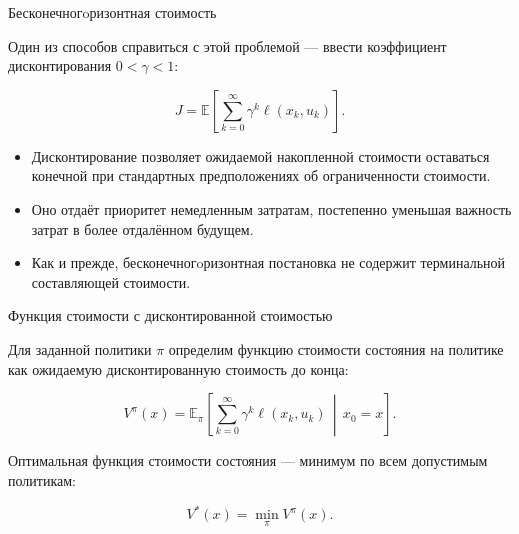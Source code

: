 \documentclass{beamer}
\begin{document}
	
	
	\begin{frame}{Бесконечногoризонтная стоимость}
		\begin{flushleft}
			
				
				Один из способов справиться с этой проблемой — ввести коэффициент
				дисконтирования $0 < \gamma < 1$:
				
				\[
				\boxed{
					J = \mathbb{E}\left[
					\sum_{k=0}^{\infty}
					\gamma^k \ell(x_k,u_k)
					\right].
				}
				\]
				
				\vspace{0.2cm}
				
				\begin{itemize}
					\item Дисконтирование позволяет ожидаемой накопленной стоимости оставаться
					конечной при стандартных предположениях об ограниченности стоимости.
					
					\item Оно отдаёт приоритет немедленным затратам, постепенно
					уменьшая важность затрат в более отдалённом будущем.
					
					\item Как и прежде, бесконечногoризонтная постановка не содержит терминальной
					составляющей стоимости.
				\end{itemize}
			
		\end{flushleft}
	\end{frame}
	
	
	
	\begin{frame}{Функция стоимости с дисконтированной стоимостью}
		\begin{flushleft}
			
			Для заданной политики $\pi$ определим функцию стоимости состояния
			на политике как ожидаемую дисконтированную стоимость до конца:
			
			\[
			V^\pi(x) =
			\mathbb{E}_\pi\left[
			\sum_{k=0}^{\infty}
			\gamma^k \ell(x_k,u_k)
			\,\middle|\, x_0=x
			\right].
			\]
			
			\vspace{0.3cm}
			
			Оптимальная функция стоимости состояния — минимум по всем
			допустимым политикам:
			
			\[
			V^*(x)=\min_\pi V^\pi(x).
			\]
			
		\end{flushleft}
	\end{frame}
	
\end{document}
